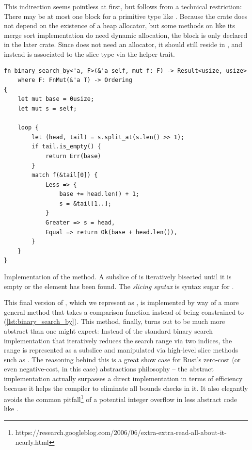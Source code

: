 This indirection seems pointless at first, but follows from a technical
restriction: There may be at most one  block for a primitive type
like \rust{[T]}. Because the  crate does not depend on the existence
of a heap allocator, but some methods on \rust{[T]} like its merge sort
implementation do need dynamic allocation, the  block is only
declared in the later  crate. Since  does
not need an allocator, it should still reside in , and instead is
associated to the slice type via the helper trait.

\begin{listing}[!bt]
\begin{verbatim}
fn binary_search_by<'a, F>(&'a self, mut f: F) -> Result<usize, usize>
    where F: FnMut(&'a T) -> Ordering
{
    let mut base = 0usize;
    let mut s = self;

    loop {
        let (head, tail) = s.split_at(s.len() >> 1);
        if tail.is_empty() {
            return Err(base)
        }
        match f(&tail[0]) {
            Less => {
                base += head.len() + 1;
                s = &tail[1..];
            }
            Greater => s = head,
            Equal => return Ok(base + head.len()),
        }
    }
}
\end{verbatim}
  
\caption{Implementation of the  method. A subslice
   of  is iteratively bisected until it is empty or the
  element has been found. The  \emph{slicing syntax} is
  syntax sugar for .}
\label{lst:binary_search_by}
\end{listing}

This final version of , which we represent as
, is implemented by way of a more
general method  that takes a comparison function instead
of being constrained to  (\autoref{lst:binary_search_by}). This
method, finally, turns out to be much more abstract than one might expect: Instead of
the standard binary search implementation that iteratively reduces the search range via two
indices, the range is represented as a subslice and manipulated via high-level
slice methods such as . The reasoning behind this is a great show
case for Rust's zero-cost (or even negative-cost, in this case) abstractions
philosophy -- the abstract implementation actually surpasses a direct
implementation in terms of efficiency because it helps the compiler to eliminate
all bounds checks in it. It also elegantly avoids the common
pitfall\footnote{https://research.googleblog.com/2006/06/extra-extra-read-all-about-it-nearly.html}
of a potential integer overflow in less abstract code like .


